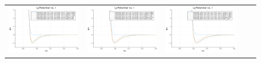 \begin{figure}[H]
\begin{tabular}{ccccc}
\begin{minipage}[t]{0.2\hsize}
      \includegraphics[width=\textwidth]{image/RaRtmap_LJ/LJ-Potential_Rt0.25.png}
      \subcaption{}
      \label{}
    \end{minipage} &
    \begin{minipage}[t]{0.2\hsize}
      \centering
      \includegraphics[width=\textwidth]{image/RaRtmap_LJ/LJ-Potential_Rt0.375.png}
      \subcaption{}
      \label{}
    \end{minipage} &
    \begin{minipage}[t]{0.2\hsize}
      \centering
      \includegraphics[width=\textwidth]{image/RaRtmap_LJ/LJ-Potential_Rt0.5.png}

\end{minipage}
\end{tabular}
\end{figure}
